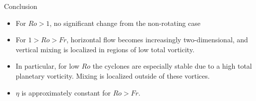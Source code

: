 \documentclass[aspecttatio=169]{beamer}
\begin{document}
\begin{frame}{Conclusion}

    \begin{itemize}
    \item For $Ro > 1$, no significant change from the non-rotating case
    \item For $1 > Ro > Fr$, horizontal flow becomes increasingly
    two-dimensional, and vertical mixing is localized in regions of low total
    vorticity. 
    \item In particular, for low $Ro$ the cyclones are especially stable due to
    a high total planetary vorticity. Mixing is localized outside of these
    vortices. 
    \item $\eta$ is approximately constant for $Ro > Fr$. 
    \end{itemize}

\end{frame}

{\scriptsize


}
\end{document}
